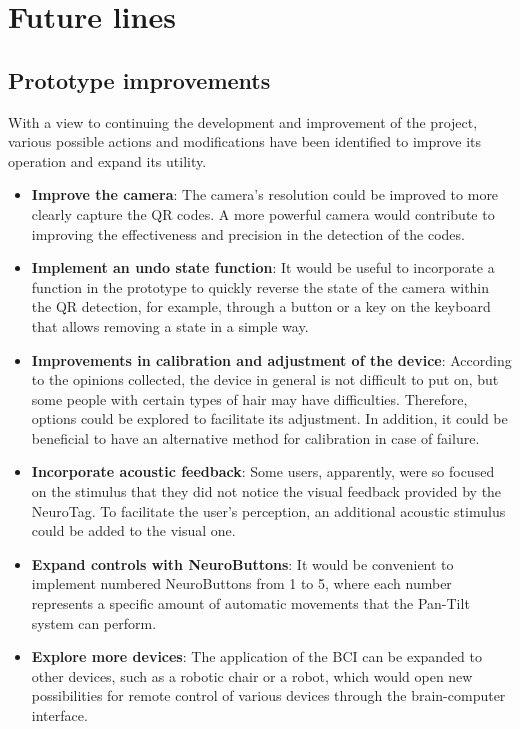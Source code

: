 \section{Future lines}

\subsection{Prototype improvements}

With a view to continuing the development and improvement of the project, various possible actions and modifications have been identified to improve its operation and expand its utility.

\begin{itemize}

\item \textbf{Improve the camera}: The camera's resolution could be improved to more clearly capture the QR codes. A more powerful camera would contribute to improving the effectiveness and precision in the detection of the codes.

\item \textbf{Implement an undo state function}: It would be useful to incorporate a function in the prototype to quickly reverse the state of the camera within the QR detection, for example, through a button or a key on the keyboard that allows removing a state in a simple way.

\item \textbf{Improvements in calibration and adjustment of the device}: According to the opinions collected, the device in general is not difficult to put on, but some people with certain types of hair may have difficulties. Therefore, options could be explored to facilitate its adjustment. In addition, it could be beneficial to have an alternative method for calibration in case of failure.

\item \textbf{Incorporate acoustic feedback}: Some users, apparently, were so focused on the stimulus that they did not notice the visual feedback provided by the NeuroTag. To facilitate the user's perception, an additional acoustic stimulus could be added to the visual one.

\item \textbf{Expand controls with NeuroButtons}: It would be convenient to implement numbered NeuroButtons from 1 to 5, where each number represents a specific amount of automatic movements that the Pan-Tilt system can perform.

\item \textbf{Explore more devices}: The application of the BCI can be expanded to other devices, such as a robotic chair or a robot, which would open new possibilities for remote control of various devices through the brain-computer interface.

\end{itemize}


